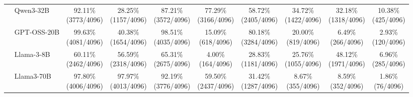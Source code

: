 \begin{table}[t]
{\begin{tabular}{ll*{8}{c}}
 & Qwen3-32B & \makecell[c]{92.11\%\\[-1pt]\scriptsize(3773/4096)} & \makecell[c]{28.25\%\\[-1pt]\scriptsize(1157/4096)} & \makecell[c]{87.21\%\\[-1pt]\scriptsize(3572/4096)} & \makecell[c]{77.29\%\\[-1pt]\scriptsize(3166/4096)} & \makecell[c]{58.72\%\\[-1pt]\scriptsize(2405/4096)} & \makecell[c]{34.72\%\\[-1pt]\scriptsize(1422/4096)} & \makecell[c]{32.18\%\\[-1pt]\scriptsize(1318/4096)} & \makecell[c]{10.38\%\\[-1pt]\scriptsize(425/4096)} \\
 & GPT-OSS-20B & \makecell[c]{99.63\%\\[-1pt]\scriptsize(4081/4096)} & \makecell[c]{40.38\%\\[-1pt]\scriptsize(1654/4096)} & \makecell[c]{98.51\%\\[-1pt]\scriptsize(4035/4096)} & \makecell[c]{15.09\%\\[-1pt]\scriptsize(618/4096)} & \makecell[c]{80.18\%\\[-1pt]\scriptsize(3284/4096)} & \makecell[c]{20.00\%\\[-1pt]\scriptsize(819/4096)} & \makecell[c]{6.49\%\\[-1pt]\scriptsize(266/4096)} & \makecell[c]{2.93\%\\[-1pt]\scriptsize(120/4096)} \\
 & Llama-3-8B & \makecell[c]{60.11\%\\[-1pt]\scriptsize(2462/4096)} & \makecell[c]{56.59\%\\[-1pt]\scriptsize(2318/4096)} & \makecell[c]{65.31\%\\[-1pt]\scriptsize(2675/4096)} & \makecell[c]{4.00\%\\[-1pt]\scriptsize(164/4096)} & \makecell[c]{28.83\%\\[-1pt]\scriptsize(1181/4096)} & \makecell[c]{25.76\%\\[-1pt]\scriptsize(1055/4096)} & \makecell[c]{48.12\%\\[-1pt]\scriptsize(1971/4096)} & \makecell[c]{6.96\%\\[-1pt]\scriptsize(285/4096)} \\
 & Llama3-70B & \makecell[c]{97.80\%\\[-1pt]\scriptsize(4006/4096)} & \makecell[c]{97.97\%\\[-1pt]\scriptsize(4013/4096)} & \makecell[c]{92.19\%\\[-1pt]\scriptsize(3776/4096)} & \makecell[c]{59.50\%\\[-1pt]\scriptsize(2437/4096)} & \makecell[c]{31.42\%\\[-1pt]\scriptsize(1287/4096)} & \makecell[c]{8.67\%\\[-1pt]\scriptsize(355/4096)} & \makecell[c]{8.59\%\\[-1pt]\scriptsize(352/4096)} & \makecell[c]{1.86\%\\[-1pt]\scriptsize(76/4096)} \\

\end{tabular}}
\end{table}
